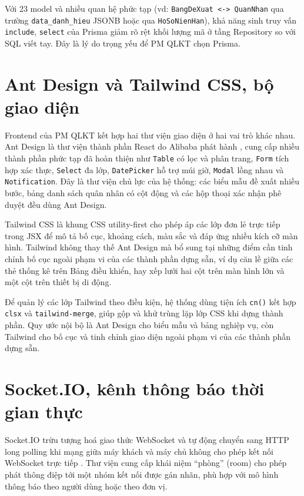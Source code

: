\documentclass[../DoAn.tex]{subfiles}
\begin{document}
Với 23 model và nhiều quan hệ phức tạp (vd: \texttt{BangDeXuat <-> QuanNhan} qua trường \texttt{data\_danh\_hieu} JSONB hoặc qua \texttt{HoSoNienHan}), khả năng sinh truy vấn \texttt{include}, \texttt{select} của Prisma giảm rõ rệt khối lượng mã ở tầng Repository so với SQL viết tay. Đây là lý do trọng yếu để PM QLKT chọn Prisma.

\section{Ant Design và Tailwind CSS, bộ giao diện}
\label{section:3.4}

Frontend của PM QLKT kết hợp hai thư viện giao diện ở hai vai trò khác nhau. Ant Design là thư viện thành phần React do Alibaba phát hành \cite{antdesigndocs}, cung cấp nhiều thành phần phức tạp đã hoàn thiện như \texttt{Table} có lọc và phân trang, \texttt{Form} tích hợp xác thực, \texttt{Select} đa lớp, \texttt{DatePicker} hỗ trợ múi giờ, \texttt{Modal} lồng nhau và \texttt{Notification}. Đây là thư viện chủ lực của hệ thống: các biểu mẫu đề xuất nhiều bước, bảng danh sách quân nhân có cột động và các hộp thoại xác nhận phê duyệt đều dùng Ant Design.

Tailwind CSS là khung CSS utility-first \cite{tailwinddocs} cho phép áp các lớp đơn lẻ trực tiếp trong JSX để mô tả bố cục, khoảng cách, màu sắc và đáp ứng nhiều kích cỡ màn hình. Tailwind không thay thế Ant Design mà bổ sung tại những điểm cần tinh chỉnh bố cục ngoài phạm vi của các thành phần dựng sẵn, ví dụ căn lề giữa các thẻ thống kê trên Bảng điều khiển, hay xếp lưới hai cột trên màn hình lớn và một cột trên thiết bị di động.

Để quản lý các lớp Tailwind theo điều kiện, hệ thống dùng tiện ích \texttt{cn()} kết hợp \texttt{clsx} và \texttt{tailwind-merge}, giúp gộp và khử trùng lặp lớp CSS khi dựng thành phần. Quy ước nội bộ là Ant Design cho biểu mẫu và bảng nghiệp vụ, còn Tailwind cho bố cục và tinh chỉnh giao diện ngoài phạm vi của các thành phần dựng sẵn.

\section{Socket.IO, kênh thông báo thời gian thực}
\label{section:3.5}

Socket.IO trừu tượng hoá giao thức WebSocket và tự động chuyển sang HTTP long polling khi mạng giữa máy khách và máy chủ không cho phép kết nối WebSocket trực tiếp \cite{socketiodocs}. Thư viện cung cấp khái niệm ``phòng'' (room) cho phép phát thông điệp tới một nhóm kết nối được gán nhãn, phù hợp với mô hình thông báo theo người dùng hoặc theo đơn vị.
\end{document}
